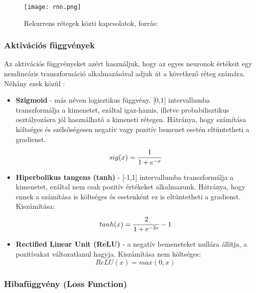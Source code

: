 {\begin{itemize}
\begin{figure}[H]
  \centering
  \texttt{[image: rnn.png]}
  \caption{Rekurrens rétegek közti kapcsolatok, forrás: \cite{deeplearningbook}}
\end{figure}

\end{itemize}

\subsubsection{Aktivációs függvények}

Az aktivációs függvényeket azért használjuk, hogy az egyes neuronok értékeit egy nemlineáris transzformáció alkalmazásával adjuk át a következő réteg számára. Néhány ezek közül \cite{deeplearningbook}:
\begin{itemize}
 \item \textbf{Szigmoid} - más néven logisztikus függvény. [0,1] intervallumba transzformálja a kimenetet, ezáltal igaz-hamis, illetve probabilisztikus osztályozásra jól használható a kimeneti rétegen. Hátránya, hogy számítása költséges és szélsőségesen negatív vagy pozitív bemenet esetén eltüntetheti a gradienst.
\begin{equation}
	sig(x) = \cfrac{1}{1+e^{-x}}
\end{equation}
 \item \textbf{Hiperbolikus tangens (tanh)} - [-1,1] intervallumba transzformálja a kimenetet, ezáltal nem csak pozitív értékeket alkalmazunk. Hátránya, hogy ennek a számítása is költséges és esetenként ez is eltüntetheti a gradienst. Kiszámítása:
\begin{equation}
	tanh(x) = \cfrac{2}{1+e^{-2x}} - 1
\end{equation}
 \item \textbf{Rectified Linear Unit (ReLU)} - a negatív bemeneteket nullára állítja, a pozitívakat változatlanul hagyja. Kiszámítása nem költséges:
\begin{equation}
	ReLU(x) = max(0, x)
\end{equation}
 \end{itemize}

\subsubsection{Hibafüggvény (Loss Function)}

}

